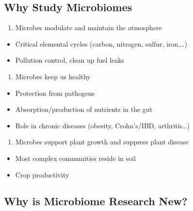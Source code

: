 \documentclass[
]{book}
\providecommand{\tightlist}{%
  \setlength{\itemsep}{0pt}\setlength{\parskip}{0pt}}
\begin{document}
\hypertarget{why-study-microbiomes}{%
\subsection{Why Study Microbiomes}\label{why-study-microbiomes}}

\begin{enumerate}
\def\labelenumi{\arabic{enumi}.}
\tightlist
\item
  Microbes modulate and maintain the atmosphere
\end{enumerate}

\begin{itemize}
\tightlist
\item
  Critical elemental cycles (carbon, nitrogen, sulfur, iron,\ldots)
\item
  Pollution control, clean up fuel leaks
\end{itemize}

\begin{enumerate}
\def\labelenumi{\arabic{enumi}.}
\setcounter{enumi}{1}
\tightlist
\item
  Microbes keep us healthy
\end{enumerate}

\begin{itemize}
\tightlist
\item
  Protection from pathogens
\item
  Absorption/production of nutrients in the gut
\item
  Role in chronic diseases (obesity, Crohn's/IBD, arthritis\ldots)
\end{itemize}

\begin{enumerate}
\def\labelenumi{\arabic{enumi}.}
\setcounter{enumi}{2}
\tightlist
\item
  Microbes support plant growth and suppress plant disease
\end{enumerate}

\begin{itemize}
\tightlist
\item
  Most complex communities reside in soil
\item
  Crop productivity
\end{itemize}

\hypertarget{why-is-microbiome-research-new}{%
\subsection{Why is Microbiome Research New?}\label{why-is-microbiome-research-new}}
\end{document}

